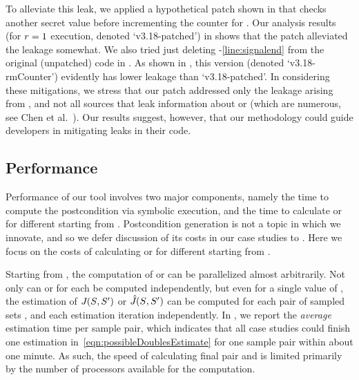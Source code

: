 To alleviate this leak, we applied a hypothetical patch shown
in  that checks another secret value \tcpack before
incrementing the counter for \linuxmibdelayedacklost.  Our analysis
results (for $r=1$ execution, denoted `v3.18-patched') in
 shows that the patch alleviated the leakage somewhat.
We also tried just deleting -\ref{line:signalend}
from the original (unpatched) code in .  As shown in
, this version (denoted `v3.18-rmCounter') evidently
has lower leakage than `v3.18-patched'.  In considering these
mitigations, we stress that our patch addressed only the leakage
arising from , and not all sources that leak
information about \tcpseq or \tcpack (which are numerous, see Chen et
al.~\cite{Chen:static}).  Our results suggest, however, that our
methodology could guide developers in mitigating leaks in their code.

\subsection{Performance}
\label{sscf:sec:case-studies:perf}

Performance of our tool involves two major components, namely the time
to compute the postcondition \postcondition{\proc}{} via symbolic
execution, and the time to calculate \Jaccard{\secretsSetSize} or
\JaccardRand{\secretsSetSize} for different \secretsSetSize starting
from \postcondition{\proc}{}.  Postcondition generation is not a topic
in which we innovate, and so we defer discussion of its costs in our
case studies to .  Here we focus on the costs of
calculating \Jaccard{\secretsSetSize} or \JaccardRand{\secretsSetSize}
for different \secretsSetSize starting from \postcondition{\proc}{}.


Starting from \postcondition{\proc}{}, the
computation of \Jaccard{\secretsSetSize} or
\JaccardRand{\secretsSetSize} can be parallelized almost arbitrarily.
Not only can \Jaccard{\secretsSetSize} or
\JaccardRand{\secretsSetSize} for each \secretsSetSize be computed
independently, but even for a single value of \secretsSetSize, the
estimation of $J_{}(S_{}, S_{}')$ or
$\hat{J}_{}(S_{}, S_{}')$ can be computed for
each pair of sampled sets \secretsSet{}, \secretsSetAlt{} and each
estimation iteration independently.  In , we
report the \textit{average} estimation time per sample pair, which indicates
that all case studies could finish one estimation
in~\eqref{eqn:possibleDoublesEstimate} for one sample pair within
about one minute.  As such, the speed of calculating final pair
\secretsSetSizeMin{} and \secretsSetSizeMax{} is limited primarily by
the number of processors available for the computation.

